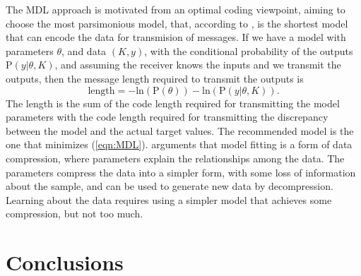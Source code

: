 	The MDL approach is motivated from an optimal coding viewpoint, aiming to choose the most parsimonious model, that, according to \citet{Hastie09}, is the shortest model that can encode the data for transmision of messages.
	If we have a model with parameters $\theta$, and data $(K, y)$, with the conditional probability of the outputs $\mathrm{P}(y | \theta, K)$, and assuming the receiver knows the inputs and we transmit the outputs, then the message length required to transmit the outputs is
    \begin{equation} \mathrm{length} = - \mathrm{ln} \left( \mathrm{P}( \theta ) \right) - \mathrm{ln} \left( \mathrm{P}(y | \theta, K) \right) . \label{eqn:MDL} \end{equation}
    The length is the sum of the code length required for transmitting the model parameters with the code length required for transmitting the discrepancy between the model and the actual target values. 
    The recommended model is the one that minimizes (\ref{eqn:MDL}).
	\citet{McElreath20} arguments that model fitting is a form of data compression, where parameters explain the relationships among the data. 
	The parameters compress the data into a simpler form, with some loss of information about the sample, and 
	can be used to generate new data by decompression.
	Learning about the data requires using a simpler model that achieves some compression, but not too much.
    \color{black}

\section{Conclusions}

